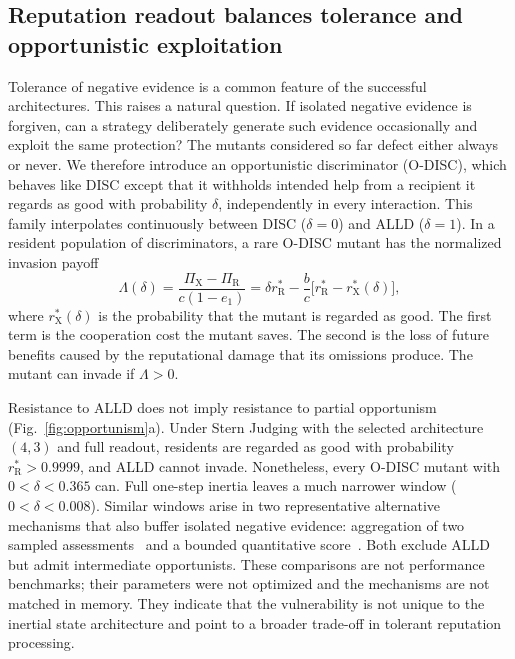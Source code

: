 \documentclass[fleqn,10pt]{article}
\begin{document}
\subsection*{Reputation readout balances tolerance and opportunistic exploitation}

Tolerance of negative evidence is a common feature of the successful architectures. This raises a natural question. If isolated negative evidence is forgiven, can a strategy deliberately generate such evidence occasionally and exploit the same protection? The mutants considered so far defect either always or never. We therefore introduce an opportunistic discriminator (O-DISC), which behaves like DISC except that it withholds intended help from a recipient it regards as good with probability $\delta$, independently in every interaction. This family interpolates continuously between DISC ($\delta=0$) and ALLD ($\delta=1$). In a resident population of discriminators, a rare O-DISC mutant has the normalized invasion payoff
\begin{equation}
\Lambda(\delta)
=\frac{\Pi_{\mathrm X}-\Pi_{\mathrm R}}{c(1-e_1)}
=\delta r_{\mathrm R}^*
-\frac{b}{c}\bigl[r_{\mathrm R}^*-r_{\mathrm X}^*(\delta)\bigr],
\label{eq:opportunistic-invasion-results}
\end{equation}
where $r_{\mathrm X}^*(\delta)$ is the probability that the mutant is regarded as good. The first term is the cooperation cost the mutant saves. The second is the loss of future benefits caused by the reputational damage that its omissions produce. The mutant can invade if $\Lambda>0$.

Resistance to ALLD does not imply resistance to partial opportunism (Fig.~\ref{fig:opportunism}a). Under Stern Judging with the selected architecture $(4,3)$ and full readout, residents are regarded as good with probability $r_{\mathrm R}^*>0.9999$, and ALLD cannot invade. Nonetheless, every O-DISC mutant with $0<\delta<0.365$ can. Full one-step inertia leaves a much narrower window ($0<\delta<0.008$). Similar windows arise in two representative alternative mechanisms that also buffer isolated negative evidence: aggregation of two sampled assessments~\cite{michelmata2024} and a bounded quantitative score~\cite{schmid2023}. Both exclude ALLD but admit intermediate opportunists. These comparisons are not performance benchmarks; their parameters were not optimized and the mechanisms are not matched in memory. They indicate that the vulnerability is not unique to the inertial state architecture and point to a broader trade-off in tolerant reputation processing.
\end{document}
